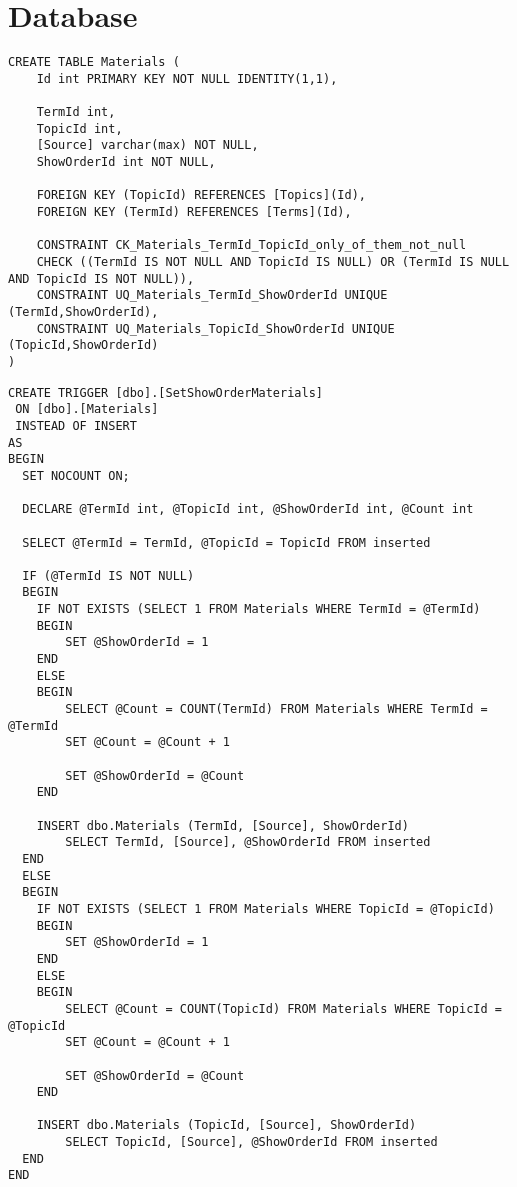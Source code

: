 \clearpage
\section{Database}

\missing


\begin{lstlisting}[style=SQLstyle, label=lst:create_table_materials, caption={This is the SQL code used for creating the Materials table}]
CREATE TABLE Materials (
	Id int PRIMARY KEY NOT NULL IDENTITY(1,1),

	TermId int,
	TopicId int,
	[Source] varchar(max) NOT NULL,
	ShowOrderId int NOT NULL,

	FOREIGN KEY (TopicId) REFERENCES [Topics](Id),
	FOREIGN KEY (TermId) REFERENCES [Terms](Id),

	CONSTRAINT CK_Materials_TermId_TopicId_only_of_them_not_null 
	CHECK ((TermId IS NOT NULL AND TopicId IS NULL) OR (TermId IS NULL AND TopicId IS NOT NULL)),
	CONSTRAINT UQ_Materials_TermId_ShowOrderId UNIQUE (TermId,ShowOrderId),
	CONSTRAINT UQ_Materials_TopicId_ShowOrderId UNIQUE (TopicId,ShowOrderId)
)
\end{lstlisting}

\clearpage
\begin{lstlisting}[style=SQLstyle]
CREATE TRIGGER [dbo].[SetShowOrderMaterials]
 ON [dbo].[Materials]
 INSTEAD OF INSERT
AS
BEGIN
  SET NOCOUNT ON;
  
  DECLARE @TermId int, @TopicId int, @ShowOrderId int, @Count int
          
  SELECT @TermId = TermId, @TopicId = TopicId FROM inserted
  
  IF (@TermId IS NOT NULL)
  BEGIN
	IF NOT EXISTS (SELECT 1 FROM Materials WHERE TermId = @TermId)
	BEGIN
		SET @ShowOrderId = 1
	END
	ELSE
	BEGIN
		SELECT @Count = COUNT(TermId) FROM Materials WHERE TermId = @TermId 
		SET @Count = @Count + 1

		SET @ShowOrderId = @Count
	END

	INSERT dbo.Materials (TermId, [Source], ShowOrderId)
		SELECT TermId, [Source], @ShowOrderId FROM inserted 
  END
  ELSE
  BEGIN
	IF NOT EXISTS (SELECT 1 FROM Materials WHERE TopicId = @TopicId)
	BEGIN
		SET @ShowOrderId = 1
	END
	ELSE
	BEGIN
		SELECT @Count = COUNT(TopicId) FROM Materials WHERE TopicId = @TopicId
		SET @Count = @Count + 1

		SET @ShowOrderId = @Count
	END

	INSERT dbo.Materials (TopicId, [Source], ShowOrderId)
		SELECT TopicId, [Source], @ShowOrderId FROM inserted 
  END
END
\end{lstlisting}

